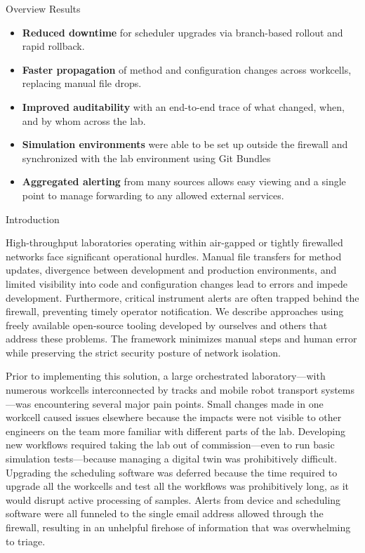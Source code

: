 \documentclass[final]{beamer}
\newlength{\colwidth}
\begin{document}
\begin{frame}[t]
\begin{columns}[t]
\begin{column}{\colwidth}
\begin{block}{Overview}
    Results
    \begin{itemize}
\item \textbf{Reduced downtime} for scheduler upgrades via branch-based rollout and rapid rollback.
  \item \textbf{Faster propagation} of method and configuration changes across workcells, replacing manual file drops.      
      \item \textbf{Improved auditability} with an end-to-end trace of what changed, when, and by whom across the lab.
      \item \textbf{Simulation environments} were able to be set up outside the firewall and synchronized with the lab environment using Git Bundles
      \item \textbf{Aggregated alerting} from many sources allows easy viewing and a single point to manage forwarding to any allowed external services.      
    \end{itemize}

  \end{block}

  \begin{block}{Introduction}

    High-throughput laboratories operating within air-gapped or tightly firewalled networks face significant operational hurdles. Manual file transfers for method updates, divergence between development and production environments, and limited visibility into code and configuration changes lead to errors and impede development. Furthermore, critical instrument alerts are often trapped behind the firewall, preventing timely operator notification. We describe approaches using freely available open-source tooling developed by ourselves and others that address these problems. The framework minimizes manual steps and human error while preserving the strict security posture of network isolation. 

    Prior to implementing this solution, a large orchestrated laboratory---with numerous workcells interconnected by tracks and mobile robot transport systems---was encountering several major pain points.  Small changes made in one workcell caused issues elsewhere because the impacts were not visible to other engineers on the team more familiar with different parts of the lab.  Developing new workflows required taking the lab out of commission---even to run basic simulation tests---because managing a digital twin was prohibitively difficult. Upgrading the scheduling software was deferred because the time required to upgrade all the workcells and test all the workflows was prohibitively long, as it would disrupt active processing of samples. Alerts from device and scheduling software were all funneled to the single email address allowed through the firewall, resulting in an unhelpful firehose of information that was overwhelming to triage. 
    

\end{block}
\end{column}
\end{columns}
\end{frame}
\end{document}
